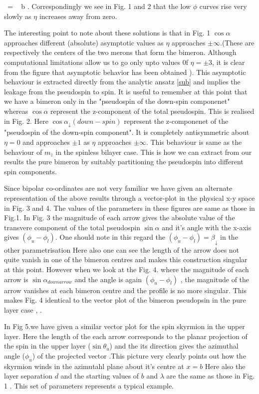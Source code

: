 \beq \kappa \ = \  b \eeq.
Correspondingly we see in
Fig. 1 and 2 that the low $\phi$ curves rise very 
slowly as $\eta$ increases away
from zero. 

The  interesting point to note about these solutions is that in Fig. 1 
$\cos \alpha$ approaches different (absolute) asymptotic values as $\eta$
approaches $\pm \infty$.(These are respectively the centers of the two 
merons that form the bimeron. Although computational limitations allow us 
to go only upto values 0f $\eta = \pm 3$, it is clear from the figure that
asymptotic behavior has been obtained ). 
 This asymptotic behaviour is extracted directly
 from the analytic ansatz \ref{sub} and implies the leakage from the
pseudospin to spin. It is useful to remember at this point that
we have a bimeron only in the "pseudospin of the down-spin componenet"
whereas  $\cos \alpha$ represent the z-component of the total pseudospin.
This is realised in Fig. 2. Here $\cos \alpha_{\downarrow}
(down-spin)$ represent 
the z-componenet of the "pseudospin of the down-spin component".
It is completely antisymmetric about $\eta = 0$ and approaches 
$\pm 1$ as $\eta$ approaches $\pm \infty$. This behaviour
is same as the behaviour of $m_z$ in the spinless bilayer case.
This is how we can  extract from our results 
the pure bimeron by suitably partitioning the pseudospin
into different spin components.  

Since bipolar co-ordinates are not  very familiar
 we have given an alternate representation of the above 
results through a vector-plot in the physical x-y space in Fig. 3 and 4. The
values of the parameters in these figures are same as those in 
Fig.1. In Fig. 3 the magnitude of each arrow gives the 
absolute value of the transvere component of the total pseudospin
$\sin \alpha$ and it's angle with the x-axis gives $(\phi_u - \phi_l)$. 
One should note in this regard the  $(\phi_u - \phi_l) = \beta_{\downarrow}$
in the other parametrisation
 Here also one can see the length of the arrow does not quite vanish 
in one of the bimeron centres and makes this construction singular
at this point.
However when we look at the Fig. 4. where the magnitude of each 
arrow is $\sin \alpha_{downarrow}$ and the angle is again $(\phi_u - \phi_l)$
, the magnitude of the arrow vanishes at each bimeron centre and the
profile is no more singular. This makes Fig. 4  identical to the 
vector plot of the bimeron pseudopsin in the pure layer case \cite
{Brey}, \cite {Ghosh2}.

In Fig 5.we have given a similar vector plot for the spin skyrmion
in the upper layer.
 Here the  length of the each arrow corresponds to the  planar 
projection  of the spin in the upper layer ($\sin \theta_u$) and the 
its direction gives the azimuthal angle ($\phi_{u}$) of the projected vector
.This picture very clearly points out how the skyrmion winds in the 
azimutahl plane about it's centre at $x = b$
 Here also the layer separation $d$ and the starting values of $b$
and $\lambda$ are the same as those in  Fig. 1 .
This set of parameters  represents a typical example. 
 
